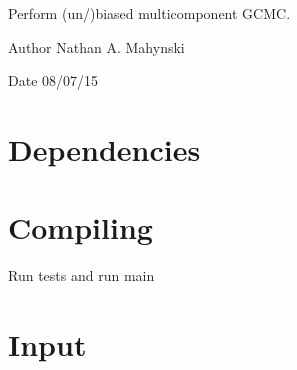 Perform (un/)biased multicomponent G\+C\+M\+C.\begin{DoxyAuthor}{Author}
Nathan A. Mahynski 
\end{DoxyAuthor}
\begin{DoxyDate}{Date}
08/07/15
\end{DoxyDate}
\hypertarget{index_Dependencies}{}\section{Dependencies}\label{index_Dependencies}
\hypertarget{index_Compiling}{}\section{Compiling}\label{index_Compiling}
Run tests and run main\hypertarget{main.cpp_Input}{}\section{Input}\label{main.cpp_Input}
